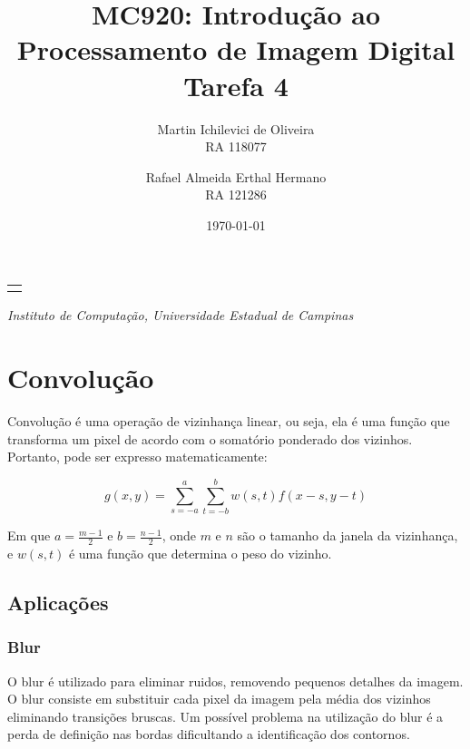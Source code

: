 \documentclass[10pt,a4paper]{article}
\makeatletter
\let\@institution\empty
\def\institution#1{\def\@institution{#1}}
\renewcommand{\maketitle}{
    \begin{center}
        {\Large\bfseries\@title\par\medskip}
        {\large
            \begin{tabular}[t]{c}%
                \@author
        \end{tabular}\par\medskip}
        {\itshape\@institution\par}
        {\itshape\@date\par}
\end{center}}
\makeatother
\begin{document}

\title{MC920: Introdução ao Processamento de Imagem Digital\\Tarefa 4}
\author{
    \begin{minipage}{6cm}
        \centering
        Martin Ichilevici de Oliveira\\
        RA 118077
    \end{minipage}
    \and
    \begin{minipage}{6cm}
        \centering
        Rafael Almeida Erthal Hermano\\
        RA 121286
    \end{minipage}
}
\institution{Instituto de Computação, Universidade Estadual de Campinas}
\date{\today}

\maketitle


\section{Convolução}
Convolução é uma operação de vizinhança linear, ou seja, ela é uma função que transforma um pixel de acordo com o somatório ponderado dos vizinhos.
Portanto, pode ser expresso matematicamente:

\begin{equation}
    g(x,y) = \sum_{s = -a}^{a}\sum_{t = -b}^{b}w(s,t) f(x - s, y - t)
    \label{eq:conv_eq}
\end{equation}

Em que $a = \frac{m-1}{2}$ e $b = \frac{n-1}{2}$, onde $m$ e $n$ são o tamanho da janela da vizinhança, e $w(s,t)$ é uma função que determina o peso do vizinho.

\subsection{Aplicações}
\subsubsection{Blur}
O blur é utilizado para eliminar ruidos, removendo pequenos detalhes da imagem. O blur consiste em substituir cada pixel da imagem pela média dos vizinhos eliminando transições bruscas. Um possível problema na utilização do blur é a perda de definição nas bordas dificultando a identificação dos contornos.
\end{document}

